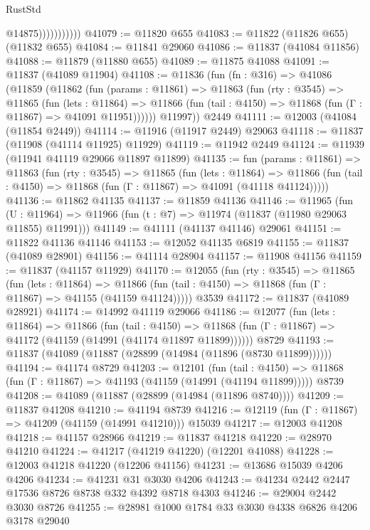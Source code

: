 \begin{lexlean}{RustStd}
\begin{coremodule}
{\begin{coremodule}
{{{{{{{{{{{{{{{{{{{{{{{{{{{{{{{{{{{{{{{{{{{{{{{{{{                          @14875)))))))))))
@41079 := @11820 @655
@41083 := @11822 (@11826 @655) (@11832 @655)
@41084 := @11841 @29060
@41086 := @11837 (@41084 @11856)
@41088 := @11879 (@11880 @655)
@41089 := @11875 @41088
@41091 := @11837 (@41089 @11904)
@41108 := @11836
    (fun (fn : @316) =>
    @41086
      (@11859
        (@11862
          (fun (params : @11861) =>
          @11863
            (fun (rty : @3545) =>
            @11865
              (fun (lets : @11864) =>
              @11866 (fun (tail : @4150) => @11868 (fun (Γ : @11867) => @41091 @11951))))))
        @11997))
    @2449
@41111 := @12003 (@41084 (@11854 @2449))
@41114 := @11916 (@11917 @2449) @29063
@41118 := @11837 (@11908 (@41114 @11925) @11929)
@41119 := @11942 @2449
@41124 := @11939 (@11941 @41119 @29066 @11897 @11899)
@41135 := fun (params : @11861) =>
  @11863
    (fun (rty : @3545) =>
    @11865
      (fun (lets : @11864) =>
      @11866 (fun (tail : @4150) => @11868 (fun (Γ : @11867) => @41091 (@41118 @41124)))))
@41136 := @11862 @41135
@41137 := @11859 @41136
@41146 := @11965
    (fun (U : @11964) => @11966 (fun (t : @7) => @11974 (@11837 (@11980 @29063 @11855) @11991)))
@41149 := @41111 (@41137 @41146) @29061
@41151 := @11822 @41136 @41146
@41153 := @12052 @41135 @6819
@41155 := @11837 (@41089 @28901)
@41156 := @41114 @28904
@41157 := @11908 @41156
@41159 := @11837 (@41157 @11929)
@41170 := @12055
    (fun (rty : @3545) =>
    @11865
      (fun (lets : @11864) =>
      @11866 (fun (tail : @4150) => @11868 (fun (Γ : @11867) => @41155 (@41159 @41124)))))
    @3539
@41172 := @11837 (@41089 @28921)
@41174 := @14992 @41119 @29066
@41186 := @12077
    (fun (lets : @11864) =>
    @11866
      (fun (tail : @4150) =>
      @11868 (fun (Γ : @11867) => @41172 (@41159 (@14991 (@41174 @11897 @11899))))))
    @8729
@41193 := @11837 (@41089 (@11887 (@28899 (@14984 (@11896 (@8730 @11899))))))
@41194 := @41174 @8729
@41203 := @12101
    (fun (tail : @4150) => @11868 (fun (Γ : @11867) => @41193 (@41159 (@14991 (@41194 @11899)))))
    @8739
@41208 := @41089 (@11887 (@28899 (@14984 (@11896 @8740))))
@41209 := @11837 @41208
@41210 := @41194 @8739
@41216 := @12119 (fun (Γ : @11867) => @41209 (@41159 (@14991 @41210))) @15039
@41217 := @12003 @41208
@41218 := @41157 @28966
@41219 := @11837 @41218
@41220 := @28970 @41210
@41224 := @41217 (@41219 @41220) (@12201 @41088)
@41228 := @12003 @41218 @41220 (@12206 @41156)
@41231 := @13686 @15039 @4206 @4206
@41234 := @41231 @31 @3030 @4206
@41243 := @41234 @2442 @2447 @17536 @8726 @8738 @332 @4392 @8718 @4303
@41246 := @29004 @2442 @3030 @8726
@41255 := @28981 @1000 @1784 @33 @3030 @4338 @6826 @4206 @3178 @29040
}}}}}}}}}}}}}}}}}}}}}}}}}}}}}}}}}}}}}}}}}}}}}}}}}}
\end{coremodule}}
\end{coremodule}
\end{lexlean}

